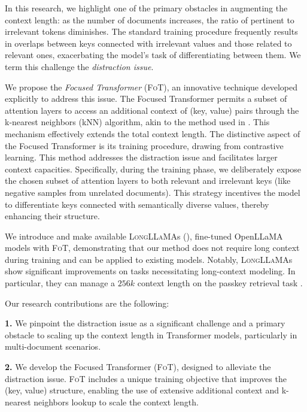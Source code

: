 In this research, we highlight one of the primary obstacles in augmenting the context length: as the number of documents increases, the ratio of pertinent to irrelevant tokens diminishes. The standard training procedure frequently results in overlaps between keys connected with irrelevant values and those related to relevant ones, exacerbating the model's task of differentiating between them. We term this challenge the \emph{distraction issue}.

We propose the \emph{Focused Transformer} (\textsc{FoT}), an innovative technique developed explicitly to address this issue. The Focused Transformer permits a subset of attention layers to access an additional context of (key, value) pairs through the k-nearest neighbors (kNN) algorithm, akin to the method used in \citep{wu2022memorizing}. This mechanism effectively extends the total context length. The distinctive aspect of the Focused Transformer is its training procedure, drawing from contrastive learning. This method addresses the distraction issue and facilitates larger context capacities. Specifically, during the training phase, we deliberately expose the chosen subset of attention layers to both relevant and irrelevant keys (like negative samples from unrelated documents). This strategy incentives the model to differentiate keys connected with semantically diverse values, thereby enhancing their structure.

We introduce and make available \textsc{LongLLaMA}s (), fine-tuned OpenLLaMA models with \textsc{FoT}, demonstrating that our method does not require long context during training and can be applied to existing models. Notably, \textsc{LongLLaMA}s show significant improvements on tasks necessitating long-context modeling. In particular, they can manage a $256k$ context length on the passkey retrieval task \citep{mohtashami2023landmark}.

Our research contributions are the following:

\textbf{1.}  We pinpoint the  distraction issue as a significant challenge and a primary obstacle to scaling up the context length in Transformer models, particularly in multi-document scenarios.

\textbf{2.} We develop the Focused Transformer (\textsc{FoT}), designed to alleviate the distraction issue. \textsc{FoT} includes a unique training objective that improves the (key, value) structure, enabling the use of extensive additional context and k-nearest neighbors lookup to scale the context length.

